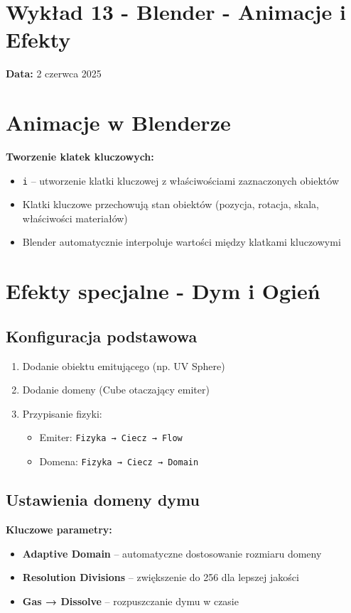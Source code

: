 \section*{Wykład 13 - Blender - Animacje i Efekty}
\textbf{Data:} 2 czerwca 2025

\section{Animacje w Blenderze}

\textbf{Tworzenie klatek kluczowych:}
\begin{itemize}[leftmargin=*]
    \item \texttt{i} -- utworzenie klatki kluczowej z właściwościami zaznaczonych obiektów
    \item Klatki kluczowe przechowują stan obiektów (pozycja, rotacja, skala, właściwości materiałów)
    \item Blender automatycznie interpoluje wartości między klatkami kluczowymi
\end{itemize}

\section{Efekty specjalne - Dym i Ogień}

\subsection{Konfiguracja podstawowa}
\begin{enumerate}
    \item Dodanie obiektu emitującego (np. UV Sphere)
    \item Dodanie domeny (Cube otaczający emiter)
    \item Przypisanie fizyki:
    \begin{itemize}
        \item Emiter: \texttt{Fizyka → Ciecz → Flow}
        \item Domena: \texttt{Fizyka → Ciecz → Domain}
    \end{itemize}
\end{enumerate}

\subsection{Ustawienia domeny dymu}
\textbf{Kluczowe parametry:}
\begin{itemize}[leftmargin=*]
    \item \textbf{Adaptive Domain} -- automatyczne dostosowanie rozmiaru domeny
    \item \textbf{Resolution Divisions} -- zwiększenie do 256 dla lepszej jakości
    \item \textbf{Gas → Dissolve} -- rozpuszczanie dymu w czasie
\end{itemize}

